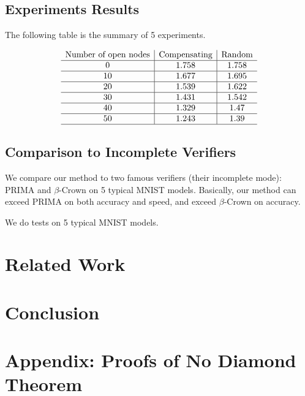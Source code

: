 \documentclass{llncs}
\begin{document}
\subsection{Experiments Results}

The following table is the summary of 5 experiments.

\[
\begin{array}{c|c|c}
	
	\text{Number of open nodes}  &  \text{Compensating} & \text{Random}  \\ \hline
	0  &  1.758 & 1.758  \\ \hline
	10  &  1.677 & 1.695  \\ \hline
	20  &  1.539 & 1.622  \\ \hline
	30  &  1.431 & 1.542  \\ \hline
	40  &  1.329 & 1.47  \\ \hline
	50  &  1.243 & 1.39  \\ \hline
\end{array}
\]


\subsection{Comparison to Incomplete Verifiers}

We compare our method to two famous verifiers (their incomplete mode): PRIMA and $\beta$-Crown on 5 typical MNIST models. Basically, our method can exceed PRIMA on both accuracy and speed, and exceed $\beta$-Crown on accuracy. 


We do tests on 5 typical MNIST models.

\section{Related Work}

\section{Conclusion}

\section*{Appendix: Proofs of No Diamond Theorem}
\end{document}
